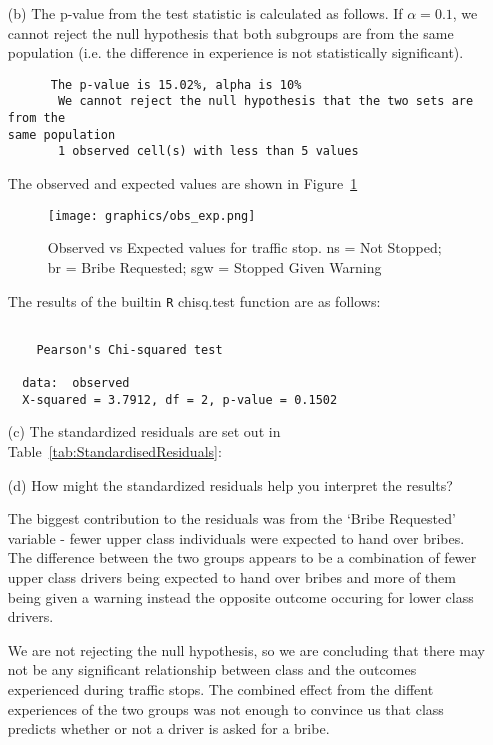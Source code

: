 \documentclass[12pt,letterpaper]{article}
\begin{document}
\begin{enumerate}
	  

	\item [(b)]
	The p-value from the test statistic is calculated as follows.  
	If $\alpha = 0.1$, we cannot reject the null hypothesis that both subgroups
	are from the same population (i.e. the difference in experience is not 
	statistically significant).\\
	
	  
	
	\begin{verbatim}
	  The p-value is 15.02%, alpha is 10%
	   We cannot reject the null hypothesis that the two sets are from the
same population
	   1 observed cell(s) with less than 5 values
	\end{verbatim}

  The observed and expected values are shown in Figure~\ref{fig:obs_exp}	
	\begin{figure}
		  \texttt{[image: graphics/obs\_exp.png]}
		  \caption{Observed vs Expected values for traffic stop. ns = Not Stopped; br = Bribe Requested; sgw = Stopped Given Warning}\label{fig:obs_exp}
	\end{figure}

  The results of the builtin \texttt{R} chisq.test function are as follows:
  \begin{verbatim}
  
	Pearson's Chi-squared test

  data:  observed
  X-squared = 3.7912, df = 2, p-value = 0.1502
\end{verbatim}

	\item [(c)] The standardized residuals are set out in Table~\ref{tab:StandardisedResiduals}:

	
	
	\item [(d)] How might the standardized residuals help you interpret the results?  

    The biggest contribution to the residuals was from the `Bribe Requested' variable - 
    fewer upper class individuals were expected to hand over bribes.  The difference 
    between the two groups appears to be a combination of fewer upper class drivers
    being expected to hand over bribes and more of them being given a warning instead 
    the opposite outcome occuring for lower class drivers.

    We are not rejecting the null hypothesis, so we are concluding that there may
    not be any significant relationship between class and the outcomes experienced 
    during traffic stops.  The combined effect from the diffent experiences of the two 
    groups was not enough to convince us that class predicts whether or not a driver
    is asked for a bribe.
    
  
\end{enumerate}
\end{document}

